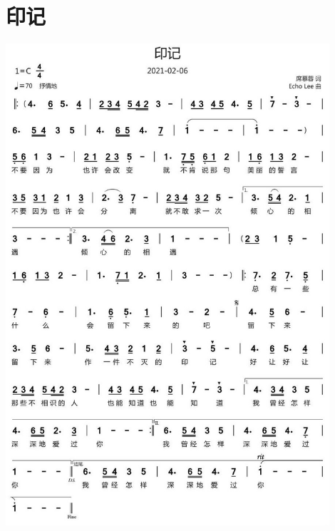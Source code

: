 \documentclass[cn,pad,twocol]{elegantbook}
\begin{document}
\section{印记} \includegraphics[width=0.9\textwidth]{rpi400/20210206印记.jpg}
\end{document}
